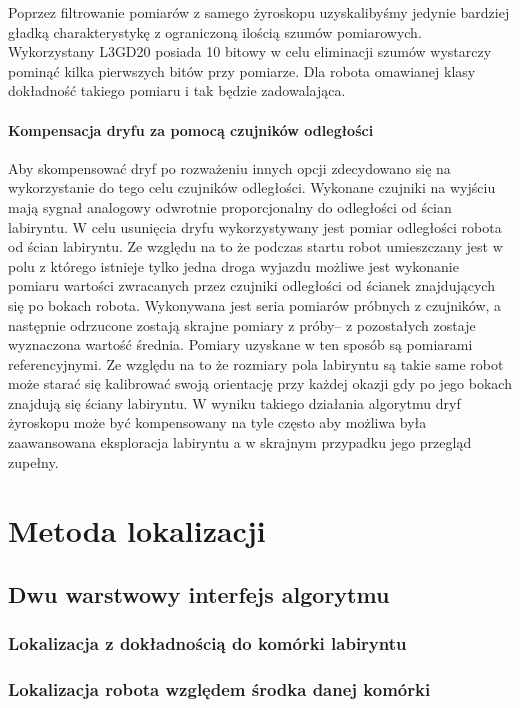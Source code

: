 \documentclass[12pt,a4paper,twoside,openright,fleqn]{mwrep}
\begin{document}
Poprzez filtrowanie pomiarów z samego żyroskopu uzyskalibyśmy jedynie bardziej gładką charakterystykę z ograniczoną ilością szumów pomiarowych. Wykorzystany L3GD20 posiada 10 bitowy w celu eliminacji szumów wystarczy pominąć kilka pierwszych bitów przy pomiarze. Dla robota omawianej klasy dokładność takiego pomiaru i tak będzie zadowalająca.

\subsubsection{Kompensacja dryfu za pomocą czujników odległości} 
Aby skompensować dryf po rozważeniu innych opcji zdecydowano się na wykorzystanie do tego celu czujników odległości. Wykonane czujniki na wyjściu mają sygnał analogowy odwrotnie proporcjonalny do odległości od ścian labiryntu. 
W celu usunięcia dryfu wykorzystywany jest pomiar odległości robota od ścian labiryntu. Ze względu na to że podczas startu robot umieszczany jest w polu z którego istnieje tylko jedna droga wyjazdu możliwe jest wykonanie pomiaru wartości zwracanych przez czujniki odległości od ścianek znajdujących się po bokach robota. Wykonywana jest seria pomiarów próbnych z czujników, a następnie odrzucone zostają skrajne pomiary z próby-- z pozostałych zostaje wyznaczona wartość średnia. Pomiary uzyskane w ten sposób są pomiarami referencyjnymi. Ze względu na to że rozmiary pola labiryntu są takie same robot może starać się kalibrować swoją orientację przy każdej okazji gdy po jego bokach znajdują się ściany labiryntu. W wyniku takiego działania algorytmu dryf żyroskopu może być kompensowany na tyle często aby możliwa była zaawansowana eksploracja labiryntu a w skrajnym przypadku jego przegląd zupełny.
\chapter{Metoda lokalizacji} %

\section{Dwu warstwowy interfejs algorytmu} 
\subsection{Lokalizacja z dokładnością do komórki labiryntu} 
\subsection{Lokalizacja robota względem środka danej komórki} 
\end{document}
